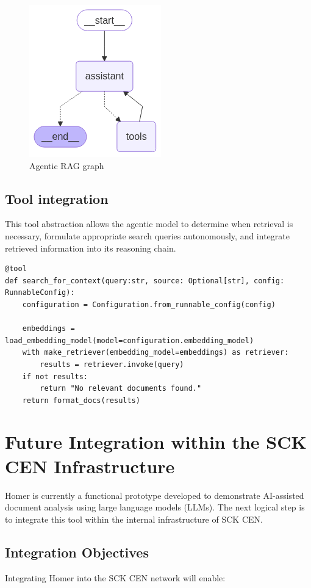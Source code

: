 \documentclass[11pt,a4paper]{report}
\begin{document}
\begin{figure}[H]
    \centering
    \includegraphics[width=0.3\linewidth]{static/schemas/agenticRAG.png}
    \caption{Agentic RAG graph}
    \label{arag}
\end{figure}

\subsection*{Tool integration}
This tool abstraction allows the agentic model to determine when retrieval is necessary, formulate appropriate search queries autonomously, and integrate retrieved information into its reasoning chain. 
\begin{lstlisting}
@tool
def search_for_context(query:str, source: Optional[str], config: RunnableConfig):
    configuration = Configuration.from_runnable_config(config)
 
    embeddings = load_embedding_model(model=configuration.embedding_model)
    with make_retriever(embedding_model=embeddings) as retriever:
        results = retriever.invoke(query)
    if not results:
        return "No relevant documents found."
    return format_docs(results)
\end{lstlisting}


\section{Future Integration within the SCK CEN Infrastructure}

Homer is currently a functional prototype developed to demonstrate AI-assisted document analysis using large language models (LLMs). The next logical step is to integrate this tool within the internal infrastructure of SCK CEN.

\subsection*{Integration Objectives}

Integrating Homer into the SCK CEN network will enable:
\end{document}
